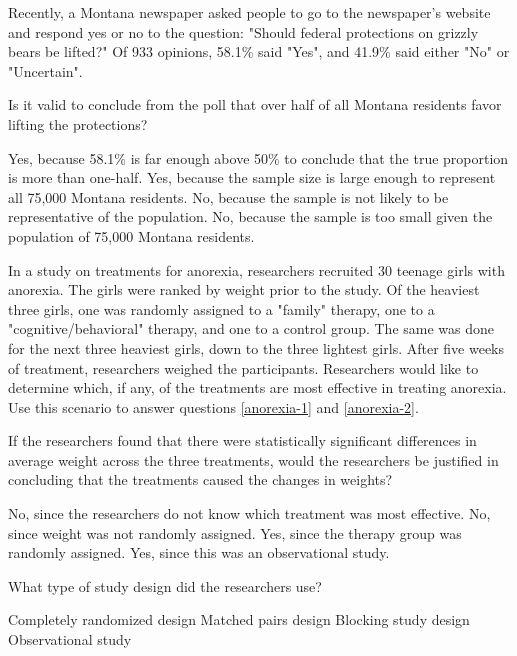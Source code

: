 \documentclass{article}
\begin{document}
\begin{mcquestions}
		\begin{mcquestioninstruction}
			Recently, a Montana newspaper asked people to go to the newspaper's website and respond yes or no to the question: "Should federal protections on grizzly bears be lifted?" Of 933 opinions, 58.1\% said "Yes", and 41.9\% said either "No" or "Uncertain".
		\end{mcquestioninstruction}
		\question Is it valid to conclude from the poll that over half of all Montana residents favor lifting the protections?
		\begin{mcanswerslist}
			\answer Yes, because 58.1\% is far enough above 50\% to conclude that the true proportion is more than one-half.
			\answer Yes, because the sample size is large enough to represent all 75,000 Montana residents.
			\answer[correct] No, because the sample is not likely to be representative of the population.
			\answer No, because the sample is too small given the population of 75,000 Montana residents.
		\end{mcanswerslist}
		
		\begin{mcquestioninstruction}
			In a study on treatments for anorexia, researchers recruited 30 teenage girls with anorexia. The girls were ranked by weight prior to the study. Of the heaviest three girls, one was randomly assigned to a "family" therapy, one to a "cognitive/behavioral" therapy, and one to a control group. The same was done for the next three heaviest girls, down to the three lightest girls. After five weeks of treatment, researchers weighed the participants. Researchers would like to determine which, if any, of the treatments are most effective in treating anorexia. Use this scenario to answer questions \ref{anorexia-1} and \ref{anorexia-2}.
		\end{mcquestioninstruction}
		\question  If the researchers found that there were statistically significant differences in average weight across the three treatments, would the researchers be justified in concluding that the treatments caused the changes in weights? \label{anorexia-1}
		\begin{mcanswerslist}
			\answer No, since the researchers do not know which treatment was most effective.
			\answer No, since weight was not randomly assigned.
			\answer[correct] Yes, since the therapy group was randomly assigned.
			\answer Yes, since this was an observational study.
		\end{mcanswerslist}
		
		\question[follow]  What type of study design did the researchers use? \label{anorexia-2}
		\begin{mcanswerslist}
			\answer Completely randomized design
			\answer Matched pairs design
			\answer[correct] Blocking study design
			\answer Observational study
		\end{mcanswerslist}
		

\end{mcquestions}
\end{document}
